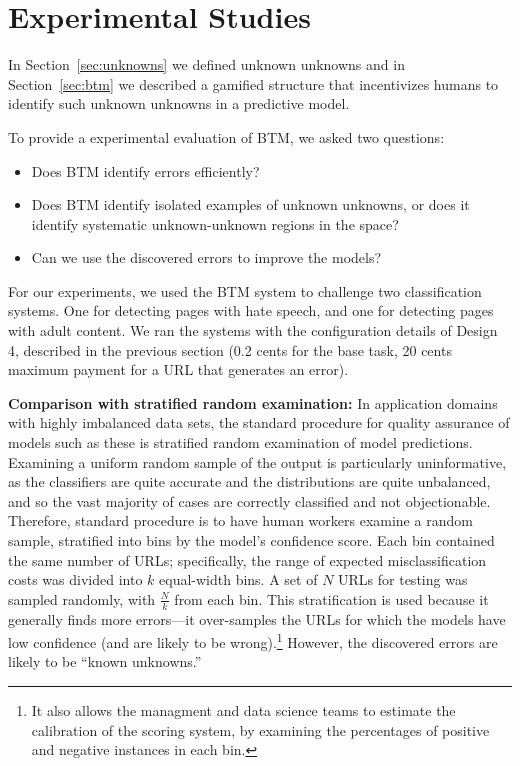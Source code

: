 \section{Experimental Studies}

In Section~\ref{sec:unknowns} we defined unknown unknowns and in Section~\ref{sec:btm} we described a gamified structure that incentivizes humans to identify such unknown unknowns in a predictive model.

To provide a experimental evaluation of BTM, we asked two questions:
\begin{itemize}

\item Does BTM identify errors efficiently?

\item Does BTM identify isolated examples of unknown unknowns, or does it identify systematic unknown-unknown regions in the space?

\item Can we use the discovered errors to improve the models?

\end{itemize}

For our experiments, we used the BTM system to challenge two classification systems. One for detecting pages with hate speech, and one for detecting pages with adult content. We ran the systems with the configuration details of Design 4, described in the previous section (0.2 cents for the base task, 20 cents maximum payment for a URL that generates an error).



\textbf{Comparison with stratified random examination:} In  application domains with highly imbalanced data sets, the standard procedure for quality assurance of models such as these is stratified random examination of model predictions. Examining a uniform random sample of the output is particularly uninformative, as the classifiers are quite accurate and the distributions are quite unbalanced, and so the vast majority of cases are correctly classified and not objectionable.  Therefore, standard procedure is to have human workers examine a random sample, stratified into bins by the model's confidence score. Each bin contained the same number of URLs; specifically, the range of expected misclassification costs was divided into $k$ equal-width bins.  A set of $N$ URLs for testing was sampled randomly, with $\frac{N}{k}$ from each bin.  This stratification is used because it generally finds more errors---it over-samples the URLs for which the models have low confidence (and are likely to be wrong).\footnote{It also allows the managment and data science teams to estimate the calibration of the scoring system, by examining the percentages of positive and negative instances in each bin.}  However, the discovered errors are likely to be ``known unknowns.''

